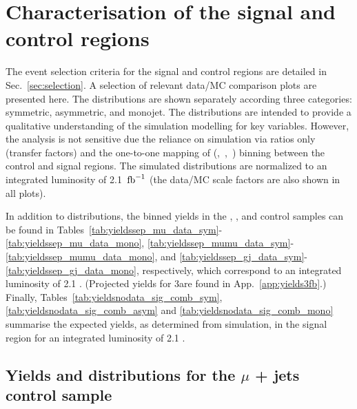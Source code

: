 \section{Characterisation of the signal and control regions}
\label{sec:yields}

The event selection criteria for the signal and control regions are
detailed in Sec.~\ref{sec:selection}. A selection of relevant data/MC
comparison plots are presented here. The distributions are shown
separately according three \njet categories: symmetric, asymmetric,
and monojet. The distributions are intended to provide a qualitative
understanding of the simulation modelling for key variables. However,
the analysis is not sensitive due the reliance on simulation via
ratios only (\ie transfer factors) and the one-to-one mapping of
(\njet,~\nb,~\scalht) binning between the control and signal
regions. The simulated distributions are normalized to an integrated
luminosity of 2.1~$\ifb$ (the data/MC scale factors are also shown
in all plots).

In addition to distributions, the binned yields in the \mj, \mmj, and
\gj control samples can be found in
Tables~\ref{tab:yieldssep_mu_data_sym}-\ref{tab:yieldssep_mu_data_mono},
\ref{tab:yieldssep_mumu_data_sym}-\ref{tab:yieldssep_mumu_data_mono},
and \ref{tab:yieldssep_gj_data_sym}-\ref{tab:yieldssep_gj_data_mono},
respectively, which correspond to an integrated luminosity of 2.1
\ifb. (Projected yields for 3\ifb are found in
App.~\ref{app:yields3fb}.) Finally,
Tables~\ref{tab:yieldsnodata_sig_comb_sym},
\ref{tab:yieldsnodata_sig_comb_asym} and \ref{tab:yieldsnodata_sig_comb_mono} summarise the expected yields, as
determined from simulation, in the signal region for an integrated
luminosity of 2.1 \ifb.

\clearpage
\subsection{Yields and distributions for the $\mu$ + jets control sample}





